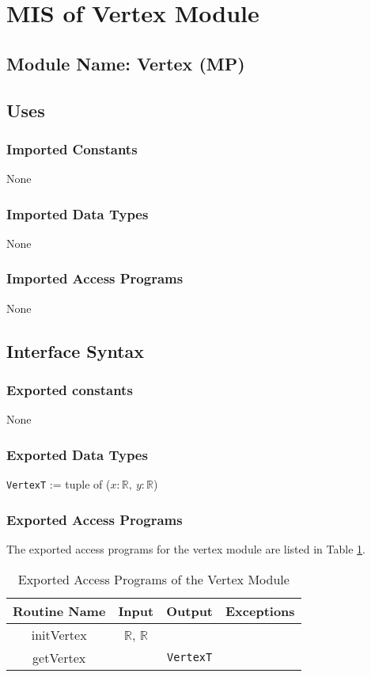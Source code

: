 \documentclass[12pt,titlepage]{article}
\begin{document}
\section{MIS of Vertex Module \label{AmisSecV}}

\subsection{Module Name: Vertex (MP)}

\subsection{Uses}
\subsubsection{Imported Constants} None
\subsubsection{Imported Data Types} None
\subsubsection{Imported Access Programs}None

\subsection{Interface Syntax}
\subsubsection{Exported constants} None
\subsubsection{Exported Data Types}
{\tt VertexT} := tuple of ($x: \mathbb{R},\  y: \mathbb{R}$)
\subsubsection{Exported Access Programs}
The exported access programs for the vertex module are listed in Table \ref{AmisVEAP}.
\begin{table}[htbp]
\centering
\begin{tabular}{|c|c|c|c|}
\hline
Routine Name & Input & Output & Exceptions \\ 
\hline
initVertex & $\mathbb{R}$, $\mathbb{R}$ & & \\
\hline
getVertex &  & {\tt VertexT} & \\
\hline
\end{tabular}
\caption{Exported Access Programs of the Vertex Module}
\label{AmisVEAP} 
\end{table}
\end{document}
